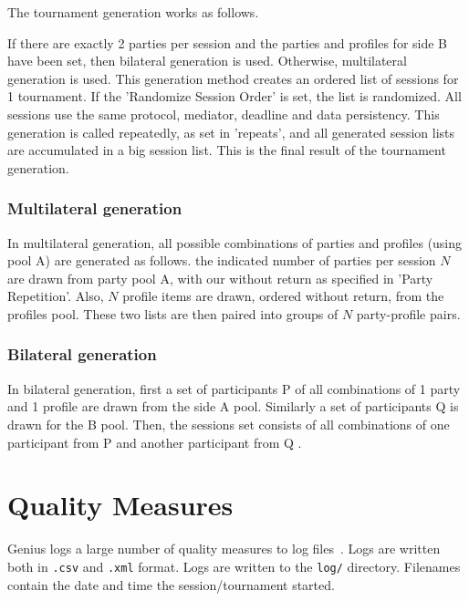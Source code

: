\documentclass[]{article}
\begin{document}
The tournament generation works as follows. 

If there are exactly 2 parties per session and the parties and profiles for side B have been set, then bilateral generation is used. Otherwise, multilateral generation is used. This generation method creates an ordered list of sessions for 1 tournament.  If the 'Randomize Session Order' is set, the list is randomized. All sessions use the same protocol, mediator, deadline and data persistency.
This generation is called repeatedly, as set in 'repeats', and all generated session lists are accumulated in a big session list. This is the final result of the  tournament generation.

\subsubsection{Multilateral generation}
In multilateral generation,  all possible combinations of parties and profiles (using pool A) are generated as follows. the indicated number of parties per session $N$ are drawn from party pool A, with our without return as specified in 'Party Repetition'. Also, $N$ profile items are drawn, ordered without return, from the profiles pool. These two lists are then paired into groups of $N$ party-profile pairs. 

\subsubsection{Bilateral generation}
In bilateral generation, first a set of participants P of all combinations of 1 party and 1 profile are drawn from the side A pool. Similarly a set of participants Q is drawn for the B pool. Then, the sessions set consists of all combinations of one participant from P and another participant from Q . 





\section{Quality Measures}\label{sec:qm}

Genius logs a large number of quality measures to log files~\cite{Baarslag12AI,Baarslag13AIT}. Logs are written both  in \verb|.csv| and \verb|.xml| format.
Logs are written to the \verb|log/| directory. Filenames contain the date and time the session/tournament started. 
\end{document}
